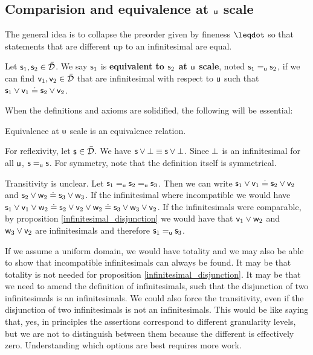 \documentclass[10pt, onecolumn, longbibliography, nofootinbib]{revtex4-2}
\begin{document}
\subsection{Comparision and equivalence at $\stmt[u]$ scale}

The general idea is to collapse the preorder given by fineness $\finer$ so that statements that are different up to an infinitesimal are equal.

\def\equivu{\cong_{\stmt[u]}}

\begin{defn}
	Let $\stmt_1, \stmt_2 \in \tdomain$. We say $\stmt_1$ is \textbf{equivalent to $\stmt_2$ at $\stmt[u]$ scale}, noted $\stmt_1 \equ \stmt_2$, if we can find $\stmt[v]_1, \stmt[v]_2 \in \tdomain$ that are infinitesimal with respect to $\stmt[u]$ such that $\stmt_1 \OR \stmt[v]_1 \eqgran \stmt_2 \OR \stmt[v]_2$.
\end{defn}

When the definitions and axioms are solidified, the following will be essential: 

\begin{desid}
	Equivalence at $\stmt[u]$ scale is an equivalence relation.
\end{desid}

\begin{remark}
	For reflexivity, let $\stmt \in \tdomain$. We have $\stmt \OR \impossibility \equiv \stmt \OR \impossibility$. Since $\impossibility$ is an infinitesimal for all $\stmt[u]$, $\stmt \equ \stmt$. For symmetry, note that the definition itself is symmetrical.
	
	Transitivity is unclear. Let $\stmt_1 \equ \stmt_2 \equ \stmt_3$. Then we can write $\stmt_1 \OR \stmt[v]_1 \eqgran \stmt_2 \OR \stmt[v]_2$ and $\stmt_2 \OR \stmt[w]_2 \eqgran \stmt_3 \OR \stmt[w]_3$. If the infinitesimal where incompatible we would have $\stmt_1 \OR \stmt[v]_1 \OR \stmt[w]_2 \eqgran \stmt_2 \OR \stmt[v]_2 \OR \stmt[w]_2 \eqgran \stmt_3 \OR \stmt[w]_3 \OR \stmt[v]_2$. If the infinitesimals were comparable, by proposition \ref{infinitesimal_disjunction} we would have that $\stmt[v]_1 \OR \stmt[w]_2$ and $\stmt[w]_3 \OR \stmt[v]_2$ are infinitesimals and therefore $\stmt_1 \equ \stmt_3$.
	
	If we assume a uniform domain, we would have totality and we may also be able to show that incompatible infinitesimals can always be found. It may be that totality is not needed for proposition \ref{infinitesimal_disjunction}. It may be that we need to amend the definition of infinitesimals, such that the disjunction of two infinitesimals is an infinitesimals. We could also force the transitivity, even if the disjunction of two infinitesimals is not an infinitesimals. This would be like saying that, yes, in principles the assertions correspond to different granularity levels, but we are not to distinguish between them because the different is effectively zero. Understanding which options are best requires more work.
\end{remark}
\end{document}
